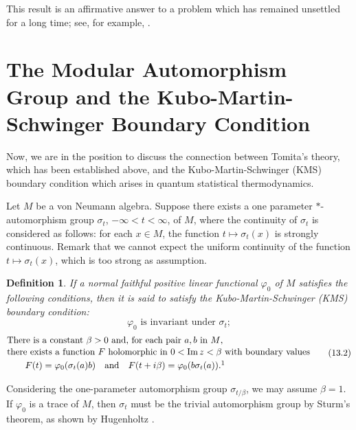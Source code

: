 \documentclass[12pt,b5paper,twoside]{article}
\theoremstyle{takesaki}
\newtheorem{definition}{Definition}[section]
\numberwithin{equation}{section}
\begin{document}
This result is an affirmative answer to a problem which has remained
unsettled for a long time; see, for example, \cite[p.~28]{ref3}.

\section{The Modular Automorphism Group and the
Kubo-Martin-Schwinger Boundary Condition}\label{sec:13}

Now, we are in the position to discuss the connection between
Tomita's theory, which has been established above, and the
Kubo-Martin-Schwinger (KMS) boundary condition which arises in quantum
statistical thermodynamics.

Let $M$ be a von Neumann algebra.  Suppose there exists a one
parameter $*$-automorphism group $\sigma_t$, $-\infty<t<\infty$, of
$M$, where the continuity of $\sigma_t$ is considered as follows: for
each $x\in M$, the function $t\mapsto\sigma_t(x)$ is strongly
continuous.  Remark that we cannot expect the uniform continuity of
the function $t\mapsto\sigma_t(x)$, which is too strong as
assumption.

\begin{definition}\label{def:13.1}
If a normal faithful positive linear functional $\varphi_0$ of $M$
satisfies the following conditions, then it is said to satisfy the
Kubo-Martin-Schwinger (KMS) boundary condition:
\begin{equation}
  \varphi_0\text{ is invariant under }\sigma_t;
  \tag{13.1}\label{eq:13.1}
\end{equation}
\begin{equation}
\begin{aligned}
  &\text{There is a constant $\beta>0$ and, for each pair $a,b$ in $M$,}\notag\\[-2pt]
  &\text{there exists a function $F$ holomorphic in
  $0<\operatorname{Im}z<\beta$ with boundary values}\notag\\
  &\qquad F(t)=\varphi_0(\sigma_t(a)b)
  \quad\text{and}\quad
  F(t+i\beta)=\varphi_0(b\sigma_t(a)).\footnotemark
\end{aligned}
\tag{13.2}\label{eq:13.2}
\end{equation}
\end{definition}

Considering the one-parameter automorphism group $\sigma_{t/\beta}$,
we may assume $\beta=1$.  If $\varphi_0$ is a trace of $M$, then
$\sigma_t$ must be the trivial automorphism group by Sturm's theorem,
as shown by Hugenholtz \cite{ref10}.
\end{document}
